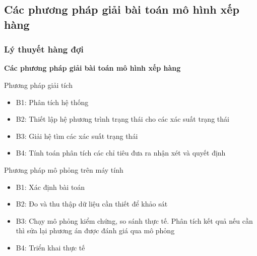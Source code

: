 \documentclass[10pt]{beamer}
\begin{document}
\subsection{Các phương pháp giải bài toán mô hình xếp hàng}
\begin{frame}
\frametitle{Lý thuyết hàng đợi}
\begin{block}{\textbf{Các phương pháp giải bài toán mô hình xếp hàng}}
\begin{minipage}{5.5cm}
\begin{block}
    \par Phương pháp giải tích\\
    \begin{itemize}
        \item B1: Phân tích hệ thống
        \item B2: Thiết lập hệ phương trình trạng thái cho các xác suất trạng thái
        \item B3: Giải hệ tìm các xác suất trạng thái
        \item B4: Tính toán phân tích các chỉ tiêu đưa ra nhận xét và quyết định
    \end{itemize}
\end{block}
\end{minipage}
\hfill
\begin{minipage}{5.5cm}
\begin{block}
    \par Phương pháp mô phỏng trên máy tính
    \begin{itemize}
        \item B1: Xác định bài toán
        \item B2: Đo và thu thập dữ liệu cần thiết để khảo sát
        \item B3: Chạy mô phỏng kiểm chứng, so sánh thực tế. Phân tích kết quả nếu cần thì sửa lại phương án được đánh giá qua mô phỏng 
        \item B4: Triển khai thực tế
    \end{itemize}
\end{block}
\end{minipage}
\end{block}
\end{frame}
\end{document}
